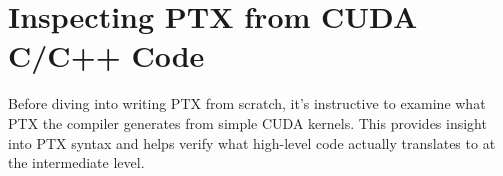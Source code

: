\section{Inspecting PTX from CUDA C/C++ Code}

Before diving into writing PTX from scratch, it's instructive to examine what PTX the compiler generates from simple CUDA kernels. This provides insight into PTX syntax and helps verify what high-level code actually translates to at the intermediate level.

